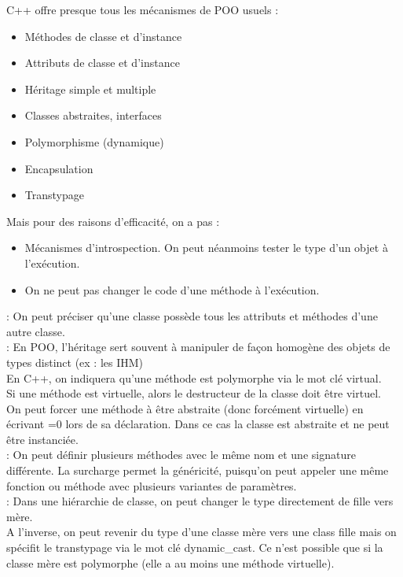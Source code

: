  C++ offre presque tous les mécanismes de POO usuels :
\begin{itemize}
	\item Méthodes de classe et d'instance
	\item Attributs de classe et d'instance
	\item Héritage simple et multiple
	\item Classes abstraites, interfaces
	\item Polymorphisme (dynamique)
	\item Encapsulation
	\item Transtypage
\end{itemize}
Mais pour des raisons d'efficacité, on a pas :
\begin{itemize}
	\item Mécanismes d'introspection. On peut néanmoins tester le type d'un objet à l'exécution.
	\item On ne peut pas changer le code d'une méthode à l'exécution.
\end{itemize}

 : On peut préciser qu'une classe possède tous les attributs et méthodes d'une autre classe. \\

 : En POO, l'héritage sert souvent à manipuler de façon homogène des objets de types distinct (ex : les IHM) \\
En C++, on indiquera qu'une méthode est polymorphe via le mot clé virtual. \\
Si une méthode est virtuelle, alors le destructeur de la classe doit être virtuel. \\
On peut forcer une méthode à être abstraite (donc forcément virtuelle) en écrivant =0 lors de sa déclaration. Dans ce cas la classe est abstraite et ne peut être instanciée. \\

 : On peut définir plusieurs méthodes avec le même nom et une signature différente. La surcharge permet la généricité, puisqu'on peut appeler une même fonction ou méthode avec plusieurs variantes de paramètres. \\

 : Dans une hiérarchie de classe, on peut changer le type directement de fille vers mère. \\
A l'inverse, on peut revenir du type d'une classe mère vers une class fille mais on spécifit le transtypage via le mot clé dynamic_cast. Ce n'est possible que si la classe mère est polymorphe (elle a au moins une méthode virtuelle). \\

